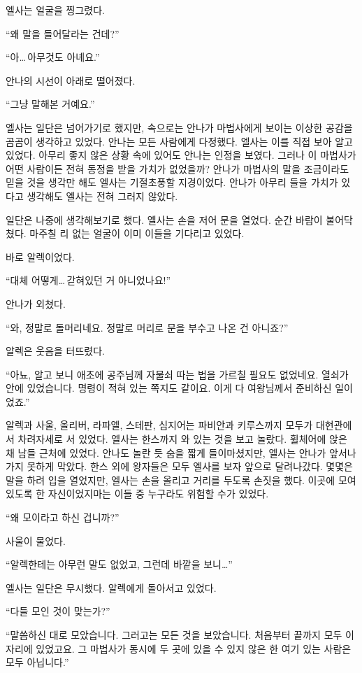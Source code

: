 엘사는 얼굴을 찡그렸다.

``왜 말을 들어달라는 건데?''

``아\ldots\,아무것도 아녜요.''

안나의 시선이 아래로 떨어졌다.

``그냥 말해본 거예요.''

엘사는 일단은 넘어가기로 했지만, 속으로는 안나가 마법사에게 보이는 이상한 공감을 곰곰이 생각하고 있었다. 안나는 모든 사람에게 다정했다. 엘사는 이를 직접 보아 알고 있었다. 아무리 좋지 않은 상황 속에 있어도 안나는 인정을 보였다. 그러나 이 마법사가 어떤 사람이든 전혀 동정을 받을 가치가 없었을까? 안나가 마법사의 말을 조금이라도 믿을 것을 생각만 해도 엘사는 기절초풍할 지경이었다. 안나가 아무리 들을 가치가 있다고 생각해도 엘사는 전혀 그러지 않았다.

일단은 나중에 생각해보기로 했다. 엘사는 손을 저어 문을 열었다. 순간 바람이 불어닥쳤다. 마주칠 리 없는 얼굴이 이미 이들을 기다리고 있었다. 

바로 알렉이었다.

``대체 어떻게\ldots\,갇혀있던 거 아니었나요!''

안나가 외쳤다.

``와, 정말로 돌머리네요. 정말로 머리로 문을 부수고 나온 건 아니죠?''

알렉은 웃음을 터뜨렸다.

``아뇨, 알고 보니 애초에 공주님께 자물쇠 따는 법을 가르칠 필요도 없었네요. 열쇠가 안에 있었습니다. 명령이 적혀 있는 쪽지도 같이요. 이게 다 여왕님께서 준비하신 일이었죠.''

알렉과 사울, 올리버, 라파엘, 스테판, 심지어는 파비안과 키루스까지 모두가 대현관에서 차려자세로 서 있었다. 엘사는 한스까지 와 있는 것을 보고 놀랐다. 휠체어에 앉은 채 남들 근처에 있었다. 안나도 놀란 듯 숨을 짧게 들이마셨지만, 엘사는 안나가 앞서나가지 못하게 막았다. 한스 외에 왕자들은 모두 엘사를 보자 앞으로 달려나갔다. 몇몇은 말을 하려 입을 열었지만, 엘사는 손을 올리고 거리를 두도록 손짓을 했다. 이곳에 모여 있도록 한 자신이었지마는 이들 중 누구라도 위험할 수가 있었다.

``왜 모이라고 하신 겁니까?''

사울이 물었다.

``알렉한테는 아무런 말도 없었고, 그런데 바깥을 보니\ldots''

엘사는 일단은 무시했다. 알렉에게 돌아서고 있었다.

``다들 모인 것이 맞는가?''

``말씀하신 대로 모았습니다. 그러고는 모든 것을 보았습니다. 처음부터 끝까지 모두 이 자리에 있었고요. 그 마법사가 동시에 두 곳에 있을 수 있지 않은 한 여기 있는 사람은 모두 아닙니다.''

